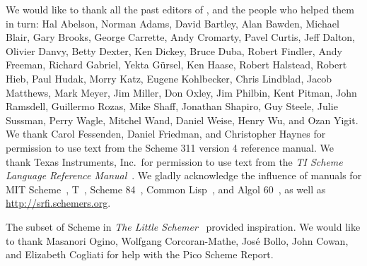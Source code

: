 We would like to thank all the past editors of \rsevenrs\cite{R7RS}, and the
people who helped them in turn: Hal Abelson, Norman Adams, David
Bartley, Alan Bawden, Michael Blair, Gary Brooks, George Carrette,
Andy Cromarty, Pavel Curtis, Jeff Dalton, Olivier Danvy, Betty Dexter,
Ken Dickey,
Bruce Duba, Robert Findler, Andy Freeman, Richard Gabriel, Yekta
G\"ursel, Ken Haase, Robert Halstead, Robert Hieb, Paul Hudak, Morry
Katz, Eugene Kohlbecker, Chris Lindblad, Jacob Matthews, Mark Meyer,
Jim Miller, Don Oxley, Jim Philbin, Kent Pitman, John Ramsdell,
Guillermo Rozas, Mike Shaff, Jonathan Shapiro, Guy Steele, Julie
Sussman, Perry Wagle, Mitchel Wand, Daniel Weise, Henry Wu, and Ozan
Yigit.  We thank Carol Fessenden, Daniel Friedman, and Christopher
Haynes for permission to use text from the Scheme 311 version 4
reference manual.  We thank Texas Instruments, Inc.~for permission to
use text from the {\em TI Scheme Language Reference
Manual}~\cite{TImanual85}.  We gladly acknowledge the influence of
manuals for MIT Scheme~\cite{MITScheme}, T~\cite{Rees84}, Scheme
84~\cite{Scheme84}, Common Lisp~\cite{CLtL}, and Algol 60~\cite{Naur63},
as well as \url{http://srfi.schemers.org}.



The subset of Scheme in
{\em The Little Schemer}~\cite{LittleSchemer} provided inspiration. We would like to thank Masanori Ogino, Wolfgang Corcoran-Mathe, José Bollo, John Cowan, and Elizabeth Cogliati
for help with the Pico Scheme Report.


